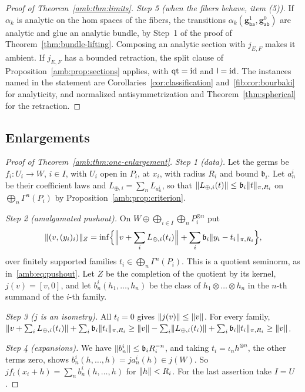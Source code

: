 \begin{proof}[Proof of Theorem~\ref{amb:thm:limits}]
\emph{Step 5 (when the fibers behave, item (5)).} If $\alpha_k$ is analytic on the hom spaces of the fibers, the transitions $\alpha_k(\mathbf g^1_{\mathsf{ba}},\mathbf g^0_{\mathsf{ab}})$ are analytic and glue an analytic bundle, by Step~1 of the proof of Theorem~\ref{thm:bundle-lifting}. Composing an analytic section with $j_{E,F}$ makes it ambient. If $j_{E,F}$ has a bounded retraction, the split clause of Proposition~\ref{amb:prop:sections} applies, with $\operatorname{qt}=\mathrm{id}$ and $\mathsf l=\mathrm{id}$. The instances named in the statement are Corollaries~\ref{cor:classification} and~\ref{fib:cor:bourbaki} for analyticity, and normalized antisymmetrization and Theorem~\ref{thm:spherical} for the retraction.
\end{proof}

\subsection{Enlargements}\label{amb:ssec:proofs-aa}

\begin{proof}[Proof of Theorem~\ref{amb:thm:one-enlargement}]
\emph{Step 1 (data).} Let the germs be $f_i\colon U_i\to W$, $i\in I$, with $U_i$ open in $P_i$, at $x_i$, with radius $R_i$ and bound $\mathfrak b_i$. Let $a^i_n$ be their coefficient laws and $L_{\oplus,i}=\sum_nL_{a^i_n}$, so that $\lVert L_{\oplus,i}(t)\rVert\le \mathfrak b_i\lVert t\rVert_{\pi,R_i}$ on $\bigoplus_n\Gamma^n(P_i)$ by Proposition~\ref{amb:prop:criterion}.

\emph{Step 2 (amalgamated pushout).} On $W\oplus\bigoplus_{i\in I}\bigoplus_nP_i^{\otimes n}$ put
\[
 \lVert (v,(y_i)_i)\rVert_Z=\inf\Bigl\{\Bigl\lVert v+\sum_iL_{\oplus,i}(t_i)\Bigr\rVert+\sum_i\mathfrak b_i\lVert y_i-t_i\rVert_{\pi,R_i}\Bigr\},
\]
over finitely supported families $t_i\in\bigoplus_n\Gamma^n(P_i)$. This is a quotient seminorm, as in~\eqref{amb:eq:pushout}. Let $Z$ be the completion of the quotient by its kernel, $j(v)=[v,0]$, and let $b^i_n(h_1,\dots,h_n)$ be the class of $h_1\otimes\dots\otimes h_n$ in the $n$\nobreakdash-th summand of the $i$\nobreakdash-th family.

\emph{Step 3 ($j$ is an isometry).} All $t_i=0$ gives $\lVert j(v)\rVert\le\lVert v\rVert$. For every family, $\lVert v+\sum_iL_{\oplus,i}(t_i)\rVert+\sum_i\mathfrak b_i\lVert t_i\rVert_{\pi,R_i}\ge\lVert v\rVert-\sum_i\lVert L_{\oplus,i}(t_i)\rVert+\sum_i\mathfrak b_i\lVert t_i\rVert_{\pi,R_i}\ge\lVert v\rVert$.

\emph{Step 4 (expansions).} We have $\lVert b^i_n\rVert\le \mathfrak b_iR_i^{-n}$, and taking $t_i=\iota_nh^{\otimes n}$, the other terms zero, shows $b^i_n(h,\dots,h)=ja^i_n(h)\in j(W)$. So $jf_i(x_i+h)=\sum_nb^i_n(h,\dots,h)$ for $\lVert h\rVert<R_i$. For the last assertion take $I=U$.
\end{proof}

